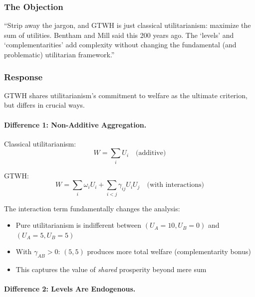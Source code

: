 \documentclass[12pt,a4paper]{article}
\begin{document}
\subsubsection{The Objection}

\begin{tcolorbox}[colback=red!5!white, colframe=red!75!black, title=Philosopher's Objection]
``Strip away the jargon, and GTWH is just classical utilitarianism: maximize 
the sum of utilities. Bentham and Mill said this 200 years ago. The `levels' 
and `complementarities' add complexity without changing the fundamental 
(and problematic) utilitarian framework.''
\end{tcolorbox}

\subsubsection{Response}

GTWH shares utilitarianism's commitment to welfare as the ultimate criterion, 
but differs in crucial ways.

\paragraph{Difference 1: Non-Additive Aggregation.}

Classical utilitarianism:
\begin{equation}
W = \sum_i U_i \quad \text{(additive)}
\end{equation}

GTWH:
\begin{equation}
W = \sum_i \omega_i U_i + \sum_{i<j} \gamma_{ij} U_i U_j \quad \text{(with interactions)}
\end{equation}

The interaction term fundamentally changes the analysis:
\begin{itemize}[nosep]
\item Pure utilitarianism is indifferent between $(U_A=10, U_B=0)$ and $(U_A=5, U_B=5)$
\item With $\gamma_{AB} > 0$: $(5,5)$ produces more total welfare (complementarity bonus)
\item This captures the value of \textit{shared} prosperity beyond mere sum
\end{itemize}

\paragraph{Difference 2: Levels Are Endogenous.}
\end{document}
